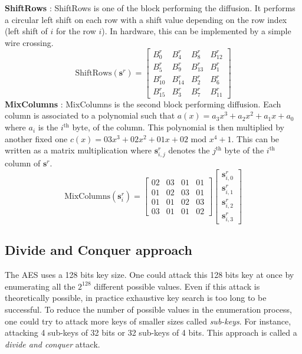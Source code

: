 \textbf{ShiftRows} : ShiftRows is one of the block performing the 
diffusion. It performs a circular left shift on each row with a shift 
value depending on the row index (left shift of $i$ for the row $i$). In 
hardware, this can be implemented by a simple wire crossing.
\begin{equation*}
    \text{ShiftRows}(\mathbf{s}^r) = \begin{bmatrix}
B_0^r    & B_4^r    & B_8^r    & B_{12}^r\\
B_5^r    & B_9^r    & B_{13}^r & B_1^r\\
B_{10}^r & B_{14}^r & B_2^r    & B_6^r\\
B_{15}^r & B_3^r    & B_7^r    & B_{11}^r
\end{bmatrix}
\end{equation*}
\textbf{MixColumns} : MixColumns is the second block performing diffusion. 
Each column is associated to a polynomial such that $a(x)= a_3 x^3 + a_2 
x^2 + a_1 x + a_0$ where $a_i$ is the $i^\text{th}$ byte, of the column. 
This polynomial is then multiplied by another fixed one 
$c(x)=03x^3+02x^2+01x+02$ $\text{mod}$ $x^4+1$. This can be written as a 
matrix multiplication where $\mathbf{s}^r_{i,j}$ denotes the $j^\text{th}$ 
byte of the $i^\text{th}$ column of $\mathbf{s}^r$.
\begin{equation*}
    \text{MixColumns}(\mathbf{s}^r_i) = \begin{bmatrix}
        02 & 03 & 01 & 01 \\
        01 & 02 & 03 & 01 \\
        01 & 01 & 02 & 03 \\
        03 & 01 & 01 & 02
    \end{bmatrix}
    \begin{bmatrix}
        \mathbf{s}^r_{i,0}\\
        \mathbf{s}^r_{i,1}\\
        \mathbf{s}^r_{i,2}\\
        \mathbf{s}^r_{i,3}
    \end{bmatrix}
\end{equation*}
\subsection{Divide and Conquer approach}
The AES uses a 128 bits key size. One could attack this 128 bits key at 
once by enumerating all the $2^{128}$ different possible values. Even if 
this attack is theoretically possible, in practice exhaustive key search 
is too long to be successful. To reduce the number of possible values in 
the enumeration process, one could try to attack more keys of smaller 
sizes called \textit{sub-keys}. For instance, attacking 4 sub-keys of 32 
bits or 32 sub-keys of 4 bits. This approach is called a \textit{divide 
and conquer} attack. \\

